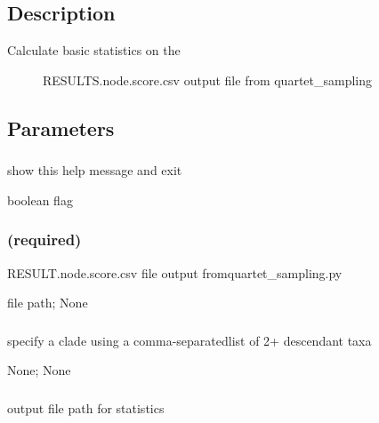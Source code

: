 \documentclass[letterpaper,12pt,english]{sphinxmanual}
\begin{document}
\subsection{Description}
\label{\detokenize{prog_desc:id14}}\begin{description}
\item[{Calculate basic statistics on the}] \leavevmode
RESULTS.node.score.csv output file
from quartet\_sampling

\end{description}


\subsection{Parameters}
\label{\detokenize{prog_desc:id15}}

\subsubsection{}
\label{\detokenize{prog_desc:id16}}
 show this help message and exit

 boolean flag


\subsubsection{ (required)}
\label{\detokenize{prog_desc:d-data-required}}
 RESULT.node.score.csv file output fromquartet\_sampling.py

 file path;  None


\subsubsection{}
\label{\detokenize{prog_desc:id17}}
 specify a clade using a comma-separatedlist of 2+ descendant taxa

 None;  None


\subsubsection{}
\label{\detokenize{prog_desc:o-out}}
 output file path for statistics
\end{document}
